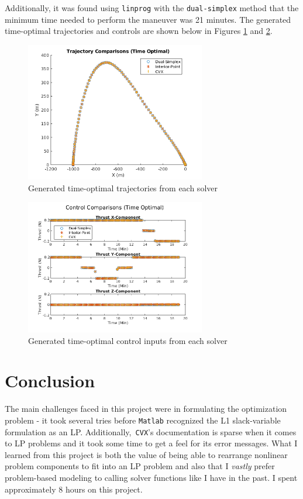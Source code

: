 \documentclass{article}
\begin{document}
Additionally, it was found using \texttt{linprog} with the \texttt{dual-simplex} method that the minimum time needed to perform the maneuver was 21 minutes.
The generated time-optimal trajectories and controls are shown below in Figures \ref{fig:trajectories-time} and \ref{fig:controls-time}.

\begin{figure}[H]
  \centering
  \includegraphics[width=0.7\textwidth]{images/trajectories_time.png}
  \caption{Generated time-optimal trajectories from each solver}
  \label{fig:trajectories-time}
\end{figure}

\begin{figure}[H]
  \centering
  \includegraphics[width=0.7\textwidth]{images/controls_time.png}
  \caption{Generated time-optimal control inputs from each solver}
  \label{fig:controls-time}
\end{figure}

\section*{Conclusion}

The main challenges faced in this project were in formulating the optimization problem - it took several tries before \texttt{Matlab} recognized the L1 slack-variable formulation as an LP.
Additionally,\texttt{ CVX}'s documentation is sparse when it comes to LP problems and it took some time to get a feel for its error messages.
What I learned from this project is both the value of being able to rearrange nonlinear problem components to fit into an LP problem and also that I \textit{vastly} prefer problem-based modeling to calling solver functions like I have in the past.
I spent approximately 8 hours on this project.
\end{document}
